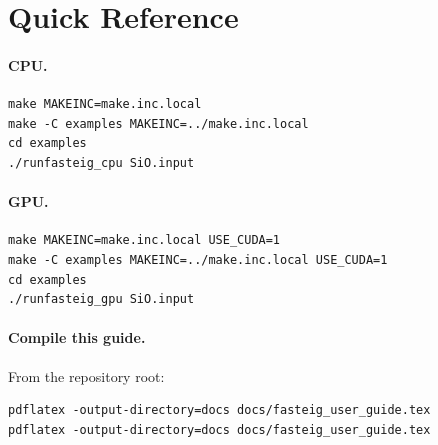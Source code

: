 \documentclass[11pt]{article}
\begin{document}
\section{Quick Reference}

\paragraph{CPU.}
\begin{lstlisting}
make MAKEINC=make.inc.local
make -C examples MAKEINC=../make.inc.local
cd examples
./runfasteig_cpu SiO.input
\end{lstlisting}

\paragraph{GPU.}
\begin{lstlisting}
make MAKEINC=make.inc.local USE_CUDA=1
make -C examples MAKEINC=../make.inc.local USE_CUDA=1
cd examples
./runfasteig_gpu SiO.input
\end{lstlisting}

\paragraph{Compile this guide.}
From the repository root:
\begin{lstlisting}
pdflatex -output-directory=docs docs/fasteig_user_guide.tex
pdflatex -output-directory=docs docs/fasteig_user_guide.tex
\end{lstlisting}
\end{document}
